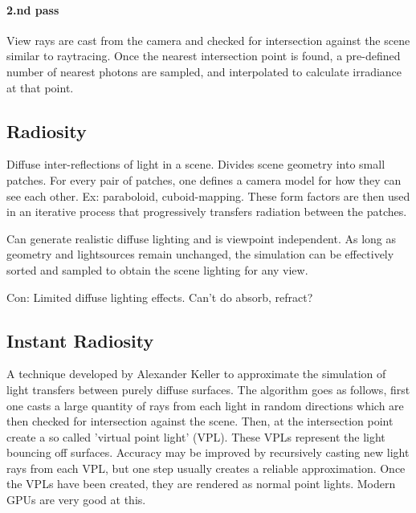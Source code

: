 		\paragraph{2.nd pass} View rays are cast from the camera and checked for intersection against the scene similar to raytracing. Once the nearest intersection point is found, a pre-defined number of nearest photons are sampled, and interpolated to calculate irradiance at that point.



			
	\subsection {Radiosity}
		Diffuse inter-reflections of light in a scene. Divides scene geometry into small
		patches. For every pair of patches, one defines a camera model for how they can
		see each other. Ex: paraboloid, cuboid-mapping. These form factors are then used
		in an iterative process that progressively transfers radiation between the
		patches.

		Can generate realistic diffuse lighting and is viewpoint independent. As long as
		geometry and lightsources remain unchanged, the simulation can be effectively
		sorted and sampled to obtain the scene lighting for any view.

		Con: Limited diffuse lighting effects. Can't do absorb, refract?

	\subsection {Instant Radiosity}
		A technique developed by Alexander Keller to approximate the simulation of light
		transfers between purely diffuse surfaces. The algorithm goes as follows, first
		one casts a large quantity of rays from each light in random directions which
		are then checked for intersection against the scene. Then, at the intersection
		point create a so called 'virtual point light' (VPL). These VPLs represent the
		light bouncing off surfaces. Accuracy may be improved by recursively casting new
		light rays from each VPL, but one step usually creates a reliable approximation.
		Once the VPLs have been created, they are rendered as normal point lights.
		Modern GPUs are very good at this.

